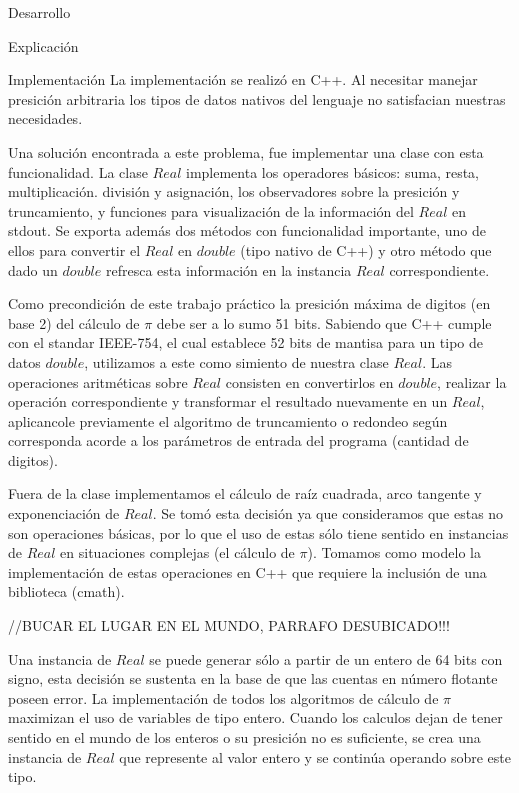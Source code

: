 \begin{section}{Desarrollo}
	\begin{subsection}{Explicación}
	\end{subsection}
	\begin{subsection}{Implementación}
		La implementación se realizó en C++. Al necesitar manejar presición arbitraria los tipos de datos nativos del lenguaje no satisfacian nuestras necesidades.
		
		Una solución encontrada a este problema, fue implementar una clase con esta funcionalidad. La clase $Real$ implementa los operadores básicos: suma, resta, multiplicación. división y asignación, los observadores sobre la presición y truncamiento, y funciones para visualización de la información del $Real$ en stdout. Se exporta además dos métodos con funcionalidad importante, uno de ellos para convertir el $Real$ en $double$ (tipo nativo de C++) y otro método que dado un $double$ refresca esta información en la instancia $Real$ correspondiente.
		
		Como precondición de este trabajo práctico la presición máxima de digitos (en base 2) del cálculo de $\pi$ debe ser a lo sumo 51 bits.
		Sabiendo que C++ cumple con el standar IEEE-754, el cual establece 52 bits de mantisa para un tipo de datos $double$, utilizamos a este como simiento de nuestra clase $Real$. Las operaciones aritméticas sobre $Real$ consisten en convertirlos en $double$, realizar la operación correspondiente y transformar el resultado nuevamente en un $Real$, aplicancole previamente el algoritmo de truncamiento o redondeo según corresponda acorde a los parámetros de entrada del programa (cantidad de digitos).
		
		Fuera de la clase implementamos el cálculo de raíz cuadrada, arco tangente y exponenciación de $Real$. Se tomó esta decisión ya que consideramos que estas no son operaciones básicas, por lo que el uso de estas sólo tiene sentido en instancias de $Real$ en situaciones complejas (el cálculo de $\pi$). Tomamos como modelo la implementación de estas operaciones en C++ que requiere la inclusión de una biblioteca (cmath).
		
		//BUCAR EL LUGAR EN EL MUNDO, PARRAFO DESUBICADO!!!
		
		Una instancia de $Real$ se puede generar sólo a partir de un entero de 64 bits con signo, esta decisión se sustenta en la base de que las cuentas en número flotante poseen error. La implementación de todos los algoritmos de cálculo de $\pi$ maximizan el uso de variables de tipo entero. Cuando los calculos dejan de tener sentido en el mundo de los enteros o su presición no es suficiente, se crea una instancia de $Real$ que represente al valor entero y se continúa operando sobre este tipo.
		   

\end{subsection}
\end{section}
